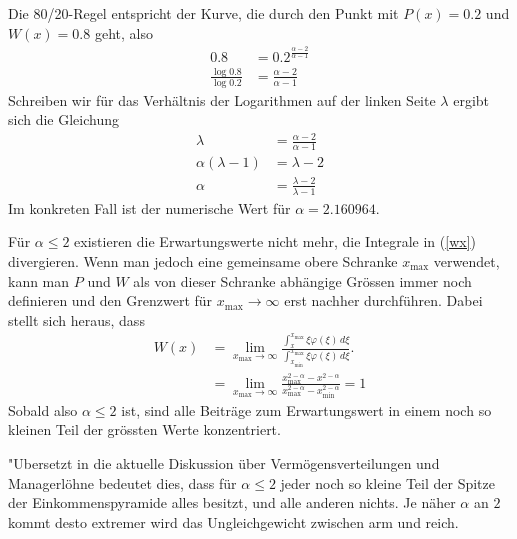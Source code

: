 Die 80/20-Regel entspricht der Kurve, die durch den 
Punkt mit $P(x)=0.2$ und $W(x)=0.8$ geht, also
\begin{align*}
0.8&=0.2^{\frac{\alpha-2}{\alpha-1}}
\\
\frac{\log 0.8}{\log 0.2}
&=
\frac{\alpha-2}{\alpha-1}
\end{align*}
Schreiben wir für das Verhältnis der Logarithmen auf der linken
Seite $\lambda$ ergibt sich die Gleichung
\begin{align*}
\lambda
&=
\frac{\alpha-2}{\alpha-1}
\\
\alpha(\lambda-1)&=\lambda-2
\\
\alpha&=\frac{\lambda-2}{\lambda-1}
\end{align*}
Im konkreten Fall ist der numerische Wert für $\alpha=2.160964$.

Für $\alpha\le 2$ existieren die Erwartungswerte nicht mehr, die
Integrale in (\ref{wx}) divergieren.
Wenn man jedoch
eine gemeinsame obere Schranke $x_{\max}$ verwendet, kann man $P$
und $W$ als von dieser Schranke abhängige Grössen immer noch
definieren und den Grenzwert für $x_{\max}\to\infty$ erst nachher
durchführen.
Dabei stellt sich heraus, dass
\begin{align*}
W(x)
&=
\lim_{x_{\max}\to\infty}
\frac%
{\int_x^{x_{\max}} \xi\varphi(\xi)\,d\xi}%
{\int_{x_{\min}}^{x_{\max}} \xi\varphi(\xi)\,d\xi}.
\\
&=
\lim_{x_{\max}\to\infty}
\frac%
{x_{\max}^{2-\alpha}-x^{2-\alpha}}%
{x_{\max}^{2-\alpha}-x_{\min}^{2-\alpha}}
=1
\end{align*}
Sobald also $\alpha\le2$ ist, sind alle Beiträge zum Erwartungswert
in einem noch so kleinen Teil der grössten Werte konzentriert.

"Ubersetzt in die aktuelle Diskussion über Vermögensverteilungen
und Managerlöhne bedeutet dies, dass für $\alpha\le2$ jeder noch so
kleine Teil der Spitze der Einkommenspyramide alles besitzt, und alle
anderen nichts.
Je näher $\alpha$ an $2$ kommt desto extremer wird
das Ungleichgewicht zwischen arm und reich.

